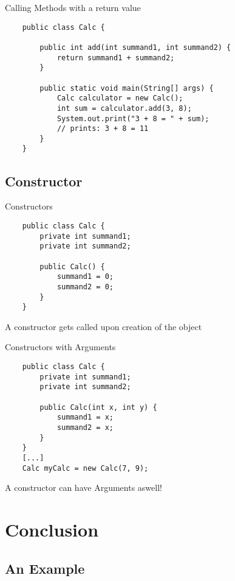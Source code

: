 \begin{frame}[fragile]{Calling Methods with a return value}
	\begin{lstlisting}
	public class Calc {
	
	    public int add(int summand1, int summand2) {
	        return summand1 + summand2;
	    }
	    
	    public static void main(String[] args) {
	        Calc calculator = new Calc();
	        int sum = calculator.add(3, 8);
	        System.out.print("3 + 8 = " + sum); 
			// prints: 3 + 8 = 11
	    }
	}
	\end{lstlisting}
\end{frame}

\subsection{Constructor}

\begin{frame}[fragile]{Constructors}
	\begin{lstlisting}
	public class Calc {
		private int summand1;
		private int summand2;
	
	    public Calc() {
			summand1 = 0;
			summand2 = 0;
	    }
	}
	\end{lstlisting}
	A constructor gets called upon creation of the object
\end{frame}

\begin{frame}[fragile]{Constructors with Arguments}
	\begin{lstlisting}
	public class Calc {
		private int summand1;
		private int summand2;
	
	    public Calc(int x, int y) {
			summand1 = x;
			summand2 = x;
	    }
	}
	[...]
	Calc myCalc = new Calc(7, 9);
	\end{lstlisting}
	A constructor can have Arguments aswell!
\end{frame}

\section{Conclusion}
\subsection{An Example}

